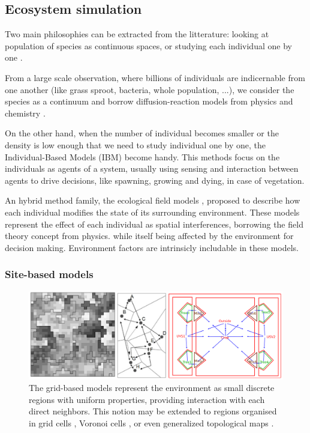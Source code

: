 \subsection{Ecosystem simulation}



Two main philosophies can be extracted from the litterature: looking at population of species as continuous spaces, or studying each individual one by one \cite{Czaran1998}.

From a large scale observation, where billions of individuals are indicernable from one another (like grass sproot, bacteria, whole population, ...), we consider the species as a continuum and borrow diffusion-reaction models from physics and chemistry \cite{Turing1952}. 

On the other hand, when the number of individual becomes smaller or the density is low enough that we need to study individual one by one, the Individual-Based Models (IBM) become handy. This methods focus on the individuals as agents of a system, usually using sensing and interaction between agents to drive decisions, like spawning, growing and dying, in case of vegetation.

An hybrid method family, the ecological field models \cite{Wu1985}, proposed to describe how each individual modifies the state of its surrounding environment. These models represent the effect of each individual as spatial interferences, borrowing the field theory concept from physics. while itself being affected by the environment for decision making. Environment factors are intrinsicly includable in these models.

\subsubsection{Site-based models}

\begin{figure}[H]
    \centering
    \includegraphics[width = .8 \linewidth]{grid-based-modeling-teaser.png}
    \caption{The grid-based models represent the environment as small discrete regions with uniform properties, providing interaction with each direct neighbors. This notion may be extended to regions organised in grid cells \cite{Nelson2012}, Voronoi cells \cite{Nelson2012}, or even generalized topological maps \cite{Lemiere2023}. }
    \label{fig:env-obj_grid-based-models}    
\end{figure}

